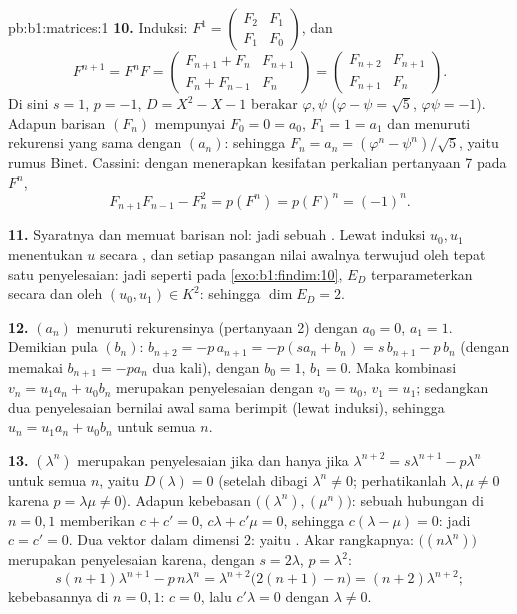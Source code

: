 \begin{solution}{pb:b1:matrices:1}
\textbf{10.} Induksi: $F^1 = \begin{pmatrix} F_2 & F_1\\ F_1 &
F_0\end{pmatrix}$, dan
\[
F^{n+1} = F^n F =
\begin{pmatrix} F_{n+1} + F_n & F_{n+1}\\
F_n + F_{n-1} & F_n \end{pmatrix}
= \begin{pmatrix} F_{n+2} & F_{n+1}\\ F_{n+1} & F_n
\end{pmatrix}.
\]
Di sini $s = 1$, $p = -1$, $D = X^2 - X - 1$ berakar $\varphi,
\psi$ ($\varphi - \psi = \sqrt5$, $\varphi\psi = -1$). Adapun
barisan $(F_n)$ mempunyai $F_0 = 0 = a_0$, $F_1 = 1 = a_1$ dan menuruti
rekurensi yang sama dengan $(a_n)$: sehingga $F_n = a_n = (\varphi^n -
\psi^n)/\sqrt5$, yaitu rumus Binet. Cassini: dengan menerapkan kesifatan
perkalian pertanyaan 7 pada $F^n$,
\[
F_{n+1}F_{n-1} - F_n^2 = p(F^n) = p(F)^n = (-1)^n .
\]

\textbf{11.} Syaratnya  dan memuat barisan
nol: jadi sebuah . Lewat induksi $u_0, u_1$ menentukan $u$
secara , dan setiap pasangan nilai awalnya terwujud oleh
tepat satu penyelesaian: jadi seperti pada \cref{exo:b1:findim:10}, $E_D$
terparameterkan secara  dan  oleh $(u_0, u_1) \in K^2$:
sehingga $\dim E_D = 2$.

\textbf{12.} $(a_n)$ menuruti rekurensinya (pertanyaan 2) dengan $a_0
= 0$, $a_1 = 1$. Demikian pula $(b_n)$: $b_{n+2} = -p\,a_{n+1} =
-p(s a_n + b_n) = s\,b_{n+1} - p\,b_n$ (dengan memakai $b_{n+1} = -pa_n$
dua kali), dengan $b_0 = 1$, $b_1 = 0$. Maka kombinasi $v_n =
u_1 a_n + u_0 b_n$ merupakan penyelesaian dengan $v_0 = u_0$, $v_1 =
u_1$; sedangkan dua penyelesaian bernilai awal sama berimpit
(lewat induksi), sehingga $u_n = u_1 a_n + u_0 b_n$ untuk semua $n$.

\textbf{13.} $(\lambda^n)$ merupakan penyelesaian jika dan hanya jika $\lambda^{n+2} =
s\lambda^{n+1} - p\lambda^n$ untuk semua $n$, yaitu $D(\lambda) = 0$
(setelah dibagi $\lambda^n \neq 0$; perhatikanlah $\lambda, \mu \neq
0$ karena $p = \lambda\mu \neq 0$). Adapun kebebasan
$\bigl((\lambda^n), (\mu^n)\bigr)$: sebuah hubungan di $n = 0, 1$
memberikan $c + c' = 0$, $c\lambda + c'\mu = 0$, sehingga $c(\lambda - \mu)
= 0$: jadi $c = c' = 0$. Dua vektor  dalam dimensi $2$: yaitu .
Akar rangkapnya: $\bigl((n\lambda^n)\bigr)$ merupakan penyelesaian karena,
dengan $s = 2\lambda$, $p = \lambda^2$:
\[
s(n+1)\lambda^{n+1} - p\,n\lambda^n
= \lambda^{n+2}\bigl(2(n+1) - n\bigr) = (n+2)\lambda^{n+2} ;
\]
kebebasannya di $n = 0, 1$: $c = 0$, lalu $c'\lambda = 0$ dengan
$\lambda \neq 0$.


\end{solution}
